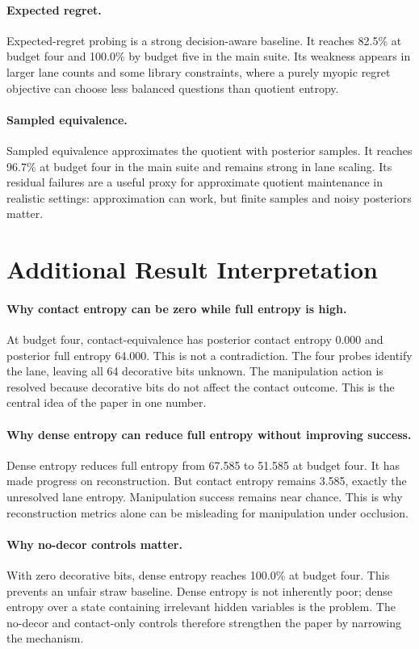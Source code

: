 \documentclass{article}
\begin{document}
\paragraph{Expected regret.}
Expected-regret probing is a strong decision-aware baseline. It reaches 82.5\% at budget four and 100.0\% by budget five in the main suite. Its weakness appears in larger lane counts and some library constraints, where a purely myopic regret objective can choose less balanced questions than quotient entropy.

\paragraph{Sampled equivalence.}
Sampled equivalence approximates the quotient with posterior samples. It reaches 96.7\% at budget four in the main suite and remains strong in lane scaling. Its residual failures are a useful proxy for approximate quotient maintenance in realistic settings: approximation can work, but finite samples and noisy posteriors matter.

\section{Additional Result Interpretation}

\paragraph{Why contact entropy can be zero while full entropy is high.}
At budget four, contact-equivalence has posterior contact entropy 0.000 and posterior full entropy 64.000. This is not a contradiction. The four probes identify the lane, leaving all 64 decorative bits unknown. The manipulation action is resolved because decorative bits do not affect the contact outcome. This is the central idea of the paper in one number.

\paragraph{Why dense entropy can reduce full entropy without improving success.}
Dense entropy reduces full entropy from 67.585 to 51.585 at budget four. It has made progress on reconstruction. But contact entropy remains 3.585, exactly the unresolved lane entropy. Manipulation success remains near chance. This is why reconstruction metrics alone can be misleading for manipulation under occlusion.

\paragraph{Why no-decor controls matter.}
With zero decorative bits, dense entropy reaches 100.0\% at budget four. This prevents an unfair straw baseline. Dense entropy is not inherently poor; dense entropy over a state containing irrelevant hidden variables is the problem. The no-decor and contact-only controls therefore strengthen the paper by narrowing the mechanism.
\end{document}
